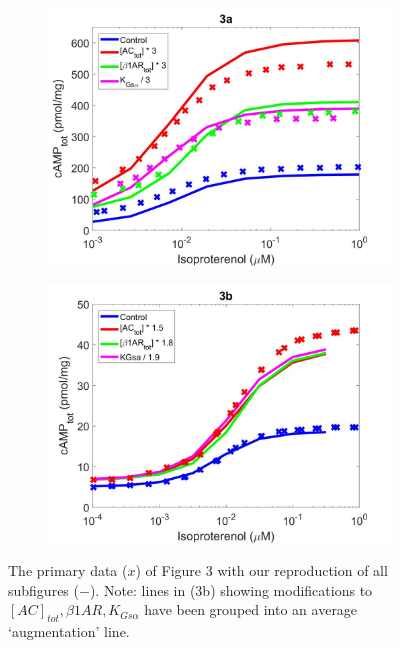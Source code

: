 \documentclass[fleqn,10pt]{physiome}
\begin{document}
\begin{figure}
    \centering
    \begin{subfigure}[b]{0.49\textwidth}
        \centering
        \includegraphics[width=\textwidth]{figures/F3a.jpg}
    \end{subfigure}
    \begin{subfigure}[b]{0.49\textwidth}
        \centering
        \includegraphics[width=\textwidth]{figures/F3b.jpg}
    \end{subfigure}
    \caption{The primary data ($x$) of Figure 3 with our reproduction of all subfigures ($-$). Note: lines in (3b) showing modifications to $[AC]_{tot}, \beta 1AR, K_{Gs\alpha }$ have been grouped into an average `augmentation' line.}
    \label{fig:3}
\end{figure}
\end{document}
